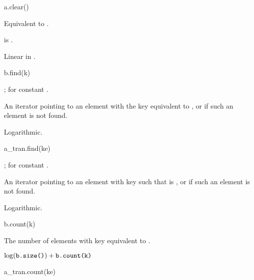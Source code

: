 %
\begin{itemdecl}
a.clear()
\end{itemdecl}

\begin{itemdescr}
\pnum
\effects
Equivalent to .

\pnum
\ensures
{} is .

\pnum
\complexity
Linear in .
\end{itemdescr}

%
\begin{itemdecl}
b.find(k)
\end{itemdecl}

\begin{itemdescr}
\pnum
\result
{};  for constant .

\pnum
\returns
An iterator pointing to an element with the key equivalent to , or
 if such an element is not found.

\pnum
\complexity
Logarithmic.
\end{itemdescr}

%
\begin{itemdecl}
a_tran.find(ke)
\end{itemdecl}

\begin{itemdescr}
\pnum
\result
{};  for constant .

\pnum
\returns
An iterator pointing to an element with key 
such that  is , or
 if such an element is not found.

\pnum
\complexity
Logarithmic.
\end{itemdescr}

%
\begin{itemdecl}
b.count(k)
\end{itemdecl}

\begin{itemdescr}
\pnum
\result
{}

\pnum
\returns
The number of elements with key equivalent to .

\pnum
\complexity
$\log (\texttt{\protect b.size()}) + \texttt{\protect b.count(k)}$
\end{itemdescr}

%
\begin{itemdecl}
a_tran.count(ke)
\end{itemdecl}

